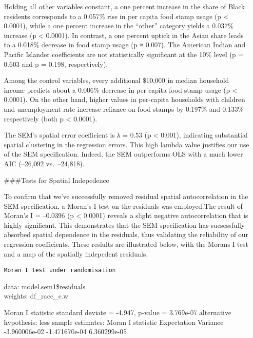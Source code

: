 \documentclass[]{article}
\begin{document}
Holding all other variables constant, a one percent increase in the
share of Black residents corresponds to a 0.057\% rise in per capita
food stamp usage (p \textless{} 0.0001), while a one percent increase in
the ``other'' category yields a 0.037\% increase (p \textless{} 0.0001).
In contrast, a one percent uptick in the Asian share leads to a 0.018\%
decrease in food stamp usage (p ≈ 0.007). The American Indian and
Pacific Islander coefficients are not statistically significant at the
10\% level (p = 0.603 and p = 0.198, respectively).

Among the control variables, every additional \$10,000 in median
household income predicts about a 0.006\% decrease in per capita food
stamp usage (p \textless{} 0.0001). On the other hand, higher values in
per-capita households with children and unemployment rate increase
reliance on food stamps by 0.197\% and 0.133\% respectively (both p
\textless{} 0.0001).

The SEM's spatial error coefficient is λ = 0.53 (p \textless{} 0.001),
indicating substantial spatial clustering in the regression errors. This
high lambda value justifies our use of the SEM specification. Indeed,
the SEM outperforms OLS with a much lower AIC (--26,092 vs.~--24,818).

\#\#\#Tests for Spatial Indepedence

To confirm that we've successfully removed residual spatial
autocorrelation in the SEM specification, a Moran's I test on the
residuals was employed.The result of Moran's I = --0.0396 (p \textless{}
0.0001) reveals a slight negative autocorrelation that is highly
significant. This demonstrates that the SEM specification has
sucsessfully absorbed spatial dependence in the residuals, thus
validating the reliability of our regression coefficients. These
reslults are illustrated below, with the Morans I test and a map of the
spatially indepedent residuals.

\begin{verbatim}
Moran I test under randomisation
\end{verbatim}

data: model.sem1\$residuals\\
weights: df\_race\_c.w

Moran I statistic standard deviate = -4.947, p-value = 3.769e-07
alternative hypothesis: less sample estimates: Moran I statistic
Expectation Variance -3.960006e-02 -1.471670e-04 6.360299e-05
\end{document}
